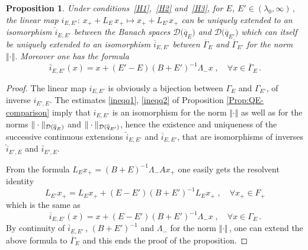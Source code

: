 \documentclass[12pt,reqno]{amsart}
\newtheorem{proposition}[theorem]{Proposition}
\newcommand{\be}[1]{\begin{equation}\label{#1}}
\newcommand{\ee}{\end{equation}}
\renewcommand{\(}{\left(}
\renewcommand{\)}{\right)}
\begin{document}
\begin{proposition}
\label{Prop:comparison}
Under conditions~\eqref{H1},~\eqref{H2} and~\eqref{H3}, for $E$, $E'\in (\lambda_0,\infty)\,,$ the linear map $i_{E,E'}:\,x_++L_E\,x_+\mapsto x_++L_{E'}x_+$ can be uniquely extended to an isomorphism $\hat{i}_{E,E'}$ between the Banach spaces $\mathcal D\big(\overline{q}_E\big)$ and $\mathcal D\big(\overline{q}_{E'}\big)$ which can itself be uniquely extended to an isomorphism $\overline{i}_{E,E'}$ between $\overline \Gamma_E$ and $\overline \Gamma_{E'}$ for the norm $\Vert\cdot\Vert$.
Moreover one has the formula
\be{extended} \overline{i}_{E,E'} (x)=x+(E'-E)(B+E')^{-1}\Lambda_- x\;,\quad\forall x\in \overline{\Gamma}_E\,.
\ee
\end{proposition}
\begin{proof}
The linear map $i_{E,E'}$ is obviously a bijection between $\Gamma_{E}$ and $\Gamma_{E'}$, of inverse $i_{E',E}$. The estimates \eqref{ineqq1}, \eqref{ineqq2} of Proposition \ref{Prop:QE-comparison} imply that $i_{E,E'}$ is an isomorphism for the norm $\Vert\cdot\Vert$ as well as for the norms $\Vert \cdot\Vert_{\mathcal D(\small{\overline{q}_E})}$ and $\Vert \cdot\Vert_{\mathcal D(\small{\overline{q}_{E'}})}$, hence the existence and uniqueness of the successive continuous extensions $\hat{i}_{E,E'}$ and $\overline{i}_{E,E'}$, that are isomorphisms of inverses $\hat{i}_{E',E}$ and $\overline{i}_{E',E}$.

\noindent From the formula $L_E x_+=(B+E)^{-1}\Lambda_-Ax_+$ one easily gets the resolvent identity
$$ L_{E'}x_+=L_E x_+ + (E-E')(B+E')^{-1}L_E x_+\;,\quad\forall x_+\in F_+$$
which is the same as
$$ \overline{i}_{E,E'} (x)=x+(E-E')(B+E')^{-1}\Lambda_- x\;,\quad\forall x\in \Gamma_E\,.$$
By continuity of $\overline{i}_{E,E'}\,$, $(B+E')^{-1}$ and $\Lambda_-$ for the norm $\Vert\cdot\Vert\,$, one can extend the above formula to $\overline{\Gamma}_E$ and this ends the proof of the proposition.
\end{proof}
\end{document}
